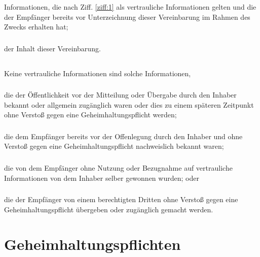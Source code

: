 \documentclass[10pt]{article}
\begin{document}
\subsubsection{} Informationen, die nach Ziff. \ref{ziff:1} als vertrauliche Informationen gelten und die der Empfänger bereits vor Unterzeichnung dieser Vereinbarung im Rahmen des Zwecks erhalten hat;

\subsubsection{} der Inhalt dieser Vereinbarung.

\subsection{} Keine vertrauliche Informationen sind solche Informationen,

\subsubsection{} die der Öffentlichkeit vor der Mitteilung oder Übergabe durch den Inhaber bekannt oder allgemein zugänglich waren oder dies zu einem späteren Zeitpunkt ohne Verstoß gegen eine Geheimhaltungspflicht werden;

\subsubsection{} die dem Empfänger bereits vor der Offenlegung durch den Inhaber und ohne Verstoß gegen eine Geheimhaltungspflicht nachweislich bekannt waren; 

\subsubsection{} die von dem Empfänger ohne Nutzung oder Bezugnahme auf vertrauliche Informationen von dem Inhaber selber gewonnen wurden; oder

\subsubsection{} die der Empfänger von einem berechtigten Dritten ohne Verstoß gegen eine Geheimhaltungspflicht übergeben oder zugänglich gemacht werden.


\section{Geheimhaltungspflichten} \label{ziff:2}
\end{document}

